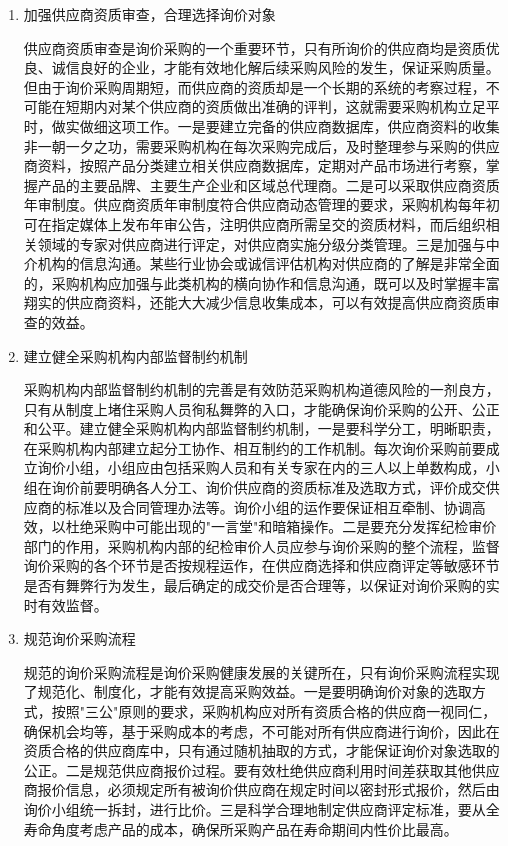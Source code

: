     \begin{enumerate}
    \item  加强供应商资质审查，合理选择询价对象

        供应商资质审查是询价采购的一个重要环节，只有所询价的供应商均是资质优良、诚信良好的企业，才能有效地化解后续采购风险的发生，保证采购质量。但由于询价采购周期短，而供应商的资质却是一个长期的系统的考察过程，不可能在短期内对某个供应商的资质做出准确的评判，这就需要采购机构立足平时，做实做细这项工作。一是要建立完备的供应商数据库，供应商资料的收集非一朝一夕之功，需要采购机构在每次采购完成后，及时整理参与采购的供应商资料，按照产品分类建立相关供应商数据库，定期对产品市场进行考察，掌握产品的主要品牌、主要生产企业和区域总代理商。二是可以采取供应商资质年审制度。供应商资质年审制度符合供应商动态管理的要求，采购机构每年初可在指定媒体上发布年审公告，注明供应商所需呈交的资质材料，而后组织相关领域的专家对供应商进行评定，对供应商实施分级分类管理。三是加强与中介机构的信息沟通。某些行业协会或诚信评估机构对供应商的了解是非常全面的，采购机构应加强与此类机构的横向协作和信息沟通，既可以及时掌握丰富翔实的供应商资料，还能大大减少信息收集成本，可以有效提高供应商资质审查的效益。

    \item  建立健全采购机构内部监督制约机制

        采购机构内部监督制约机制的完善是有效防范采购机构道德风险的一剂良方，只有从制度上堵住采购人员徇私舞弊的入口，才能确保询价采购的公开、公正和公平。建立健全采购机构内部监督制约机制，一是要科学分工，明晰职责，在采购机构内部建立起分工协作、相互制约的工作机制。每次询价采购前要成立询价小组，小组应由包括采购人员和有关专家在内的三人以上单数构成，小组在询价前要明确各人分工、询价供应商的资质标准及选取方式，评价成交供应商的标准以及合同管理办法等。询价小组的运作要保证相互牵制、协调高效，以杜绝采购中可能出现的"一言堂"和暗箱操作。二是要充分发挥纪检审价部门的作用，采购机构内部的纪检审价人员应参与询价采购的整个流程，监督询价采购的各个环节是否按规程运作，在供应商选择和供应商评定等敏感环节是否有舞弊行为发生，最后确定的成交价是否合理等，以保证对询价采购的实时有效监督。

    \item  规范询价采购流程

        规范的询价采购流程是询价采购健康发展的关键所在，只有询价采购流程实现了规范化、制度化，才能有效提高采购效益。一是要明确询价对象的选取方式，按照"三公"原则的要求，采购机构应对所有资质合格的供应商一视同仁，确保机会均等，基于采购成本的考虑，不可能对所有供应商进行询价，因此在资质合格的供应商库中，只有通过随机抽取的方式，才能保证询价对象选取的公正。二是规范供应商报价过程。要有效杜绝供应商利用时间差获取其他供应商报价信息，必须规定所有被询价供应商在规定时间以密封形式报价，然后由询价小组统一拆封，进行比价。三是科学合理地制定供应商评定标准，要从全寿命角度考虑产品的成本，确保所采购产品在寿命期间内性价比最高。


\end{enumerate}
